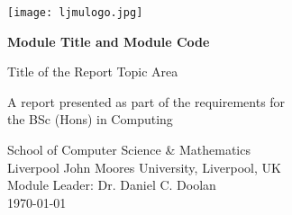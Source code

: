\begin{titlepage}
    \begin{center}
        \vspace*{1cm}
        \texttt{[image: ljmulogo.jpg]}
        
        \vspace{0.8cm}
        \huge
        \textbf{Module Title and Module Code}
        \vspace{0.5cm}
        
        \Large
        Title of the Report Topic Area
        
        \vspace{7.5cm}
        
        \large
        A report presented as part of the requirements for\\the BSc (Hons) in Computing\\
        
        \vspace{1.0cm}
        
        School of Computer Science \& Mathematics\\
        Liverpool John Moores University, Liverpool, UK\\
        \vspace{2.0cm}
        Module Leader: Dr. Daniel C. Doolan\\
        
        \vfill
        \today
    \end{center}
\end{titlepage}
